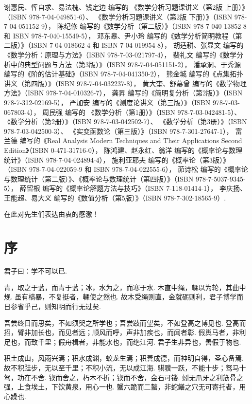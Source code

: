 谢惠民、恽自求、易法槐、钱定边 编写的
《数学分析习题课讲义（第2版 上册）》（ISBN 978-7-04-049851-6）、
《数学分析习题课讲义（第2版 下册）》（ISBN 978-7-04-051152-9），
陈纪修 编写的《数学分析（第二版）》（ISBN 978-7-040-13852-8 和 ISBN 978-7-040-15549-5），
邓东皋、尹小玲 编写的《数学分析简明教程（第二版）》（ISBN 7-04-018662-4 和 ISBN 7-04-019954-8），
胡适耕、张显文 编写的《数学分析：原理与方法》（ISBN 978-7-03-021797-4），
裴礼文 编写的《数学分析中的典型问题与方法（第3版）》（ISBN 978-7-04-051151-2），
潘承洞、于秀源 编写的《阶的估计基础》（ISBN 978-7-04-041350-2），
熊金城 编写的《点集拓扑讲义（第四版）》（ISBN 978-7-04-032237-8），
黄大奎、舒慕曾 编写的《数学物理方法》（ISBN 978-7-04-010326-7），
龚昇 编写的《简明复分析（第2版）》（ISBN 978-7-312-02169-5），
严加安 编写的《测度论讲义（第三版）》（ISBN 978-7-03-067803-4），
周民强 编写的
《数学分析（第1册）》（ISBN 978-7-03-042481-5）、
《数学分析（第2册）》（ISBN 978-7-03-042502-7）、
《数学分析（第3册）》（ISBN 978-7-03-042500-3）、
《实变函数论（第三版）》（ISBN 978-7-301-27647-1），
富兰德 编写的《Real Analysis Modern Techniques and Their Applications Second Edition》（ISBN 0-471-31716-0），
陈鸿建、赵永红、翁洋 编写的《概率论与数理统计》（ISBN 978-7-04-024894-4），
施利亚耶夫 编写的《概率论（第3版）》（ISBN 978-7-04-022059-9 和 ISBN 978-7-04-022555-6），
茆诗松 编写的《概率论与数理统计（第二版）》、《概率论与数理统计（第四版）》（ISBN 978-7-5037-9345-5），
薛留根 编写的《概率论解题方法与技巧》（ISBN 7-118-01414-1），
李庆扬、王能超、易大义 编写的《数值分析（第5版）》（ISBN 978-7-302-18565-9）.

在此对先生们表达由衷的感激！

\cleardoublepage
\chapter*{序}
君子曰：学不可以已.

青，取之于蓝，而青于蓝；冰，水为之，而寒于水.
木直中绳，輮以为轮，其曲中规.
虽有槁暴，不复挺者，輮使之然也.
故木受绳则直，金就砺则利，君子博学而日参省乎己，则知明而行无过矣.

吾尝终日而思矣，不如须臾之所学也；吾尝跂而望矣，不如登高之博见也.
登高而招，臂非加长也，而见者远；顺风而呼，声非加疾也，而闻者彰.
假舆马者，非利足也，而致千里；假舟楫者，非能水也，而绝江河.
君子生非异也，善假于物也.

积土成山，风雨兴焉；积水成渊，蛟龙生焉；积善成德，而神明自得，圣心备焉.
故不积跬步，无以至千里；不积小流，无以成江海.
骐骥一跃，不能十步；驽马十驾，功在不舍.
锲而舍之，朽木不折；锲而不舍，金石可镂.
蚓无爪牙之利筋骨之强，上食埃土，下饮黄泉，用心一也.
蟹六跪而二螯，非蛇鳝之穴无可寄托者，用心躁也.

